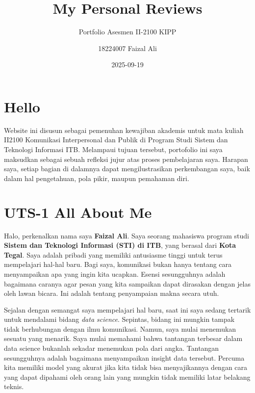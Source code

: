 \documentclass[
  letterpaper,
  DIV=11,
  numbers=noendperiod]{scrreprt}
\title{My Personal Reviews}
\subtitle{Portfolio Asesmen II-2100 KIPP}
\author{18224007 Faizal Ali}
\date{2025-09-19}
\renewcommand*\contentsname{Table of contents}
\newcommand\contentsname{Table of contents}
\begin{document}
\maketitle

\renewcommand*\contentsname{Table of contents}
{
\hypersetup{linkcolor=}
\setcounter{tocdepth}{2}
\tableofcontents
}


\chapter*{Hello}\label{hello}


Website ini disusun sebagai pemenuhan kewajiban akademis untuk mata
kuliah II2100 Komunikasi Interpersonal dan Publik di Program Studi
Sistem dan Teknologi Informasi ITB. Melampaui tujuan tersebut,
portofolio ini saya maksudkan sebagai sebuah refleksi jujur atas proses
pembelajaran saya. Harapan saya, setiap bagian di dalamnya dapat
mengilustrasikan perkembangan saya, baik dalam hal pengetahuan, pola
pikir, maupun pemahaman diri.


\chapter{UTS-1 All About Me}\label{uts-1-all-about-me}

Halo, perkenalkan nama saya \textbf{Faizal Ali}. Saya seorang mahasiswa
program studi \textbf{Sistem dan Teknologi Informasi (STI) di ITB}, yang
berasal dari \textbf{Kota Tegal}. Saya adalah pribadi yang memiliki
antusiasme tinggi untuk terus mempelajari hal-hal baru. Bagi saya,
komunikasi bukan hanya tentang cara menyampaikan apa yang ingin kita
ucapkan. Esensi sesungguhnya adalah bagaimana caranya agar pesan yang
kita sampaikan dapat dirasakan dengan jelas oleh lawan bicara. Ini
adalah tentang penyampaian makna secara utuh.

Sejalan dengan semangat saya mempelajari hal baru, saat ini saya sedang
tertarik untuk mendalami bidang \emph{data science}. Sepintas, bidang
ini mungkin tampak tidak berhubungan dengan ilmu komunikasi. Namun, saya
mulai menemukan sesuatu yang menarik. Saya mulai memahami bahwa
tantangan terbesar dalam data science bukanlah sekadar menemukan pola
dari angka. Tantangan sesungguhnya adalah bagaimana menyampaikan insight
data tersebut. Percuma kita memiliki model yang akurat jika kita tidak
bisa menyajikannya dengan cara yang dapat dipahami oleh orang lain yang
mungkin tidak memiliki latar belakang teknis.
\end{document}
